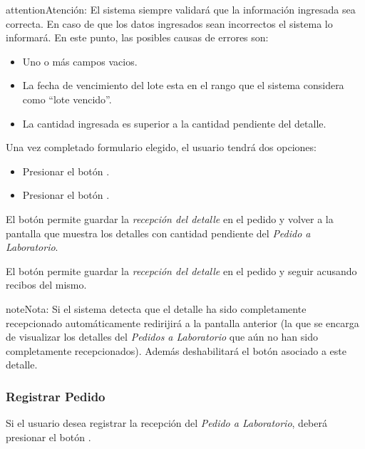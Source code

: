 \documentclass[a4paper,10pt,spanish]{sphinxmanual}
\begin{document}
\begin{notice}{attention}{Atención:}
El sistema siempre validará que la información ingresada sea correcta. En caso de que los datos ingresados sean incorrectos el sistema lo informará.
En este punto, las posibles causas de errores son:
\begin{itemize}
\item {} 
Uno o más campos vacios.

\item {} 
La fecha de vencimiento del lote esta en el rango que el sistema considera como ``lote vencido''.

\item {} 
La cantidad ingresada es superior a la cantidad pendiente del detalle.

\end{itemize}
\end{notice}

Una vez completado formulario elegido, el usuario tendrá dos opciones:
\begin{itemize}
\item {} 
Presionar el botón .

\item {} 
Presionar el botón .

\end{itemize}

El botón  permite guardar la \emph{recepción del detalle} en el pedido y volver a la pantalla que muestra los detalles con cantidad pendiente del \emph{Pedido a Laboratorio}.

El botón  permite guardar la \emph{recepción del detalle} en el pedido y seguir acusando recibos del mismo.

\begin{notice}{note}{Nota:}
Si el sistema detecta que el detalle ha sido completamente recepcionado automáticamente redirijirá a la pantalla anterior (la que se encarga de visualizar los detalles del \emph{Pedidos a Laboratorio} que aún no han sido completamente recepcionados). Además deshabilitará el botón  asociado a este detalle.
\end{notice}


\subsubsection{Registrar Pedido}
\label{receppedidosdelab:registrar-pedido-rpl}\label{receppedidosdelab:registrar-pedido}
Si el usuario desea registrar la recepción del \emph{Pedido a Laboratorio}, deberá presionar el botón .
\end{document}
